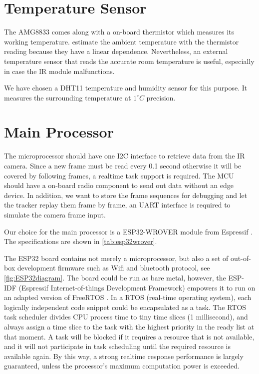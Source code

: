 \section{Temperature Sensor}
The AMG8833 comes along with a on-board thermistor which measures its working temperature. \citeauthor{trofimova2017indoor} \cite{trofimova2017indoor} estimate the ambient temperature with the thermistor reading because they have a linear dependence. Nevertheless, an external temperature sensor that reads the accurate room temperature is useful, especially in case the IR module malfunctions.

We have chosen a DHT11 temperature and humidity sensor \cite{dht11} for this purpose. It measures the surrounding temperature at $1^\circ C$ precision.
\section{Main Processor}
The microprocessor should have one I2C interface to retrieve data from the IR camera. Since a new frame must be read every 0.1 second otherwise it will be covered by following frames, a realtime task support is required. The MCU should have a on-board radio component to send out data without an edge device. In addition, we want to store the frame sequences for debugging and let the tracker replay them frame by frame, an UART interface is required to simulate the camera frame input.

Our choice for the main processor is a ESP32-WROVER module from Espressif \cite{esp32wroverboard}. The specifications are shown in \autoref{tab:esp32wrover}.

The ESP32 board contains not merely a microprocessor, but also a set of out-of-box development firmware such as Wifi and bluetooth protocol, see \autoref{fig:ESP32diagram}. The board could be run as bare metal, however, the ESP-IDF (Espressif Internet-of-things Development Framework) empowers it to run on an adapted version of FreeRTOS \cite{esp32freertos}. In a RTOS (real-time operating system), each logically independent code snippet could be encapsulated as a task. The RTOS task scheduler divides CPU process time to tiny time slices (1 millisecond), and always assign a time slice to the task with the highest priority in the ready list at that moment. A task will be blocked if it requires a resource that is not available, and it will not participate in task scheduling until the required resource is available again. By this way, a strong realtime response performance is largely guaranteed, unless the processor's maximum computation power is exceeded.

